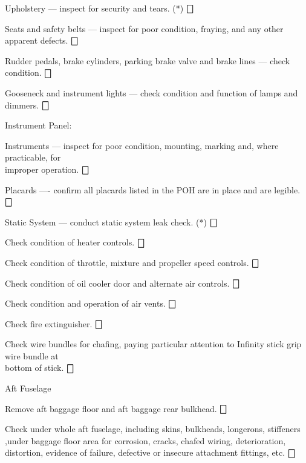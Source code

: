 \begin{enumerate*}
\begin{enumerate*}
		\item Upholstery --- inspect for security and tears. (*) \dotfill $\bigbox$
		\item Seats and safety belts --- inspect for poor condition, fraying, and any other apparent defects. \dotfill $\bigbox$
		\item Rudder pedals, brake cylinders, parking brake valve and brake lines --- check condition. \dotfill $\bigbox$
		\item Gooseneck and instrument lights --- check condition and function of lamps and dimmers. \dotfill $\bigbox$
		\item Instrument Panel:
  	\begin{enumerate*}
  		\item Instruments --- inspect for poor condition, mounting, marking and, where practicable, for \\improper operation. \dotfill $\bigbox$
  		\item Placards ---- confirm all placards listed in the POH are in place and are legible. \dotfill $\bigbox$
  		\item Static System --- conduct static system leak check. (*) \dotfill $\bigbox$
      \end{enumerate*}
		\item Check condition of heater controls. \dotfill $\bigbox$
		\item Check condition of throttle, mixture and propeller speed controls. \dotfill $\bigbox$
		\item Check condition of oil cooler door and alternate air controls. \dotfill $\bigbox$
		\item Check condition and operation of air vents. \dotfill $\bigbox$
		\item Check fire extinguisher. \dotfill $\bigbox$
		\item Check wire bundles for chafing, paying particular attention to Infinity stick grip wire bundle at \\bottom of stick. \dotfill $\bigbox$
	\end{enumerate*}
	\item{Aft Fuselage} 
	\begin{enumerate*}
		\item Remove aft baggage floor and aft baggage rear bulkhead. \dotfill $\bigbox$
		\item Check under whole aft fuselage, including skins, bulkheads, longerons, stiffeners ,under baggage floor area for corrosion, cracks, chafed wiring, deterioration, distortion, evidence of failure, defective or insecure attachment fittings, etc. \dotfill $\bigbox$

\end{enumerate*}
\end{enumerate*}
